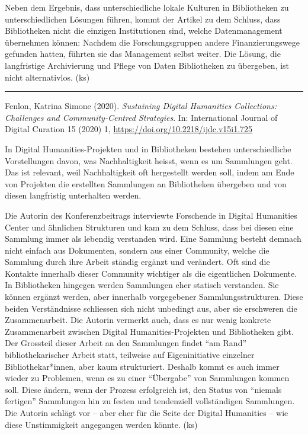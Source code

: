 \documentclass[a4paper,
fontsize=11pt,
oneside,
numbers=noperiodatend,
parskip=half-,
bibliography=totoc,
final
]{scrartcl}
\begin{document}
Neben dem Ergebnis, dass unterschiedliche lokale Kulturen in
Bibliotheken zu unterschiedlichen Lösungen führen, kommt der Artikel zu
dem Schluss, dass Bibliotheken nicht die einzigen Institutionen sind,
welche Datenmanagement übernehmen können: Nachdem die Forschungsgruppen
andere Finanzierungswege gefunden hatten, führten sie das Management
selbst weiter. Die Lösung, die langfristige Archivierung und Pflege von
Daten Bibliotheken zu übergeben, ist nicht alternativlos. (ks)

\begin{center}\rule{0.5\linewidth}{0.5pt}\end{center}

Fenlon, Katrina Simone (2020). \emph{Sustaining Digital Humanities
Collections: Challenges and Community-Centred Strategies}. In:
International Journal of Digital Curation 15 (2020) 1,
\url{https://doi.org/10.2218/ijdc.v15i1.725}

In Digital Humanities-Projekten und in Bibliotheken bestehen
unterschiedliche Vorstellungen davon, was Nachhaltigkeit heisst, wenn es
um Sammlungen geht. Das ist relevant, weil Nachhaltigkeit oft
hergestellt werden soll, indem am Ende von Projekten die erstellten
Sammlungen an Bibliotheken übergeben und von diesen langfristig
unterhalten werden.

Die Autorin des Konferenzbeitrags interviewte Forschende in Digital
Humanities Center und ähnlichen Strukturen und kam zu dem Schluss, dass
bei diesen eine Sammlung immer als lebendig verstanden wird. Eine
Sammlung besteht demnach nicht einfach aus Dokumenten, sondern aus einer
Community, welche die Sammlung durch ihre Arbeit ständig ergänzt und
verändert. Oft sind die Kontakte innerhalb dieser Community wichtiger
als die eigentlichen Dokumente. In Bibliotheken hingegen werden
Sammlungen eher statisch verstanden. Sie können ergänzt werden, aber
innerhalb vorgegebener Sammlungsstrukturen. Diese beiden Verständnisse
schliessen sich nicht unbedingt aus, aber sie erschweren die
Zusammenarbeit. Die Autorin vermerkt auch, dass es nur wenig konkrete
Zusammenarbeit zwischen Digital Humanities-Projekten und Bibliotheken
gibt. Der Grossteil dieser Arbeit an den Sammlungen findet \enquote{am
Rand} bibliothekarischer Arbeit statt, teilweise auf Eigeninitiative
einzelner Bibliothekar*innen, aber kaum strukturiert. Deshalb kommt es
auch immer wieder zu Problemen, wenn es zu einer \enquote{Übergabe} von
Sammlungen kommen soll. Diese ändern, wenn der Prozess erfolgreich ist,
den Status von \enquote{niemals fertigen} Sammlungen hin zu festen und
tendenziell vollständigen Sammlungen. Die Autorin schlägt vor -- aber
eher für die Seite der Digital Humanities -- wie diese Unstimmigkeit
angegangen werden könnte. (ks)
\end{document}
